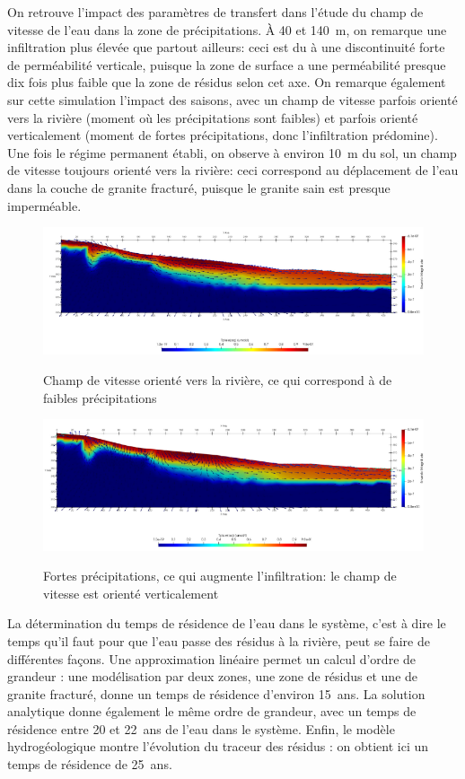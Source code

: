 \documentclass{article}
\begin{document}
On retrouve l'impact des paramètres de transfert dans l'étude du champ de vitesse de l'eau dans la zone de précipitations. À 40 et 140~m, on remarque une infiltration plus élevée que partout ailleurs: ceci est du à une discontinuité forte de perméabilité verticale, puisque la zone de surface a une perméabilité presque dix fois plus faible que la zone de résidus selon cet axe. On remarque également sur cette simulation l'impact des saisons, avec un champ de vitesse parfois orienté vers la rivière (moment où les précipitations sont faibles) et parfois orienté verticalement (moment de fortes précipitations, donc l'infiltration prédomine). Une fois le régime permanent établi, on observe à environ 10~m du sol, un champ de vitesse toujours orienté vers la rivière: ceci correspond au déplacement de l'eau dans la couche de granite fracturé, puisque le granite sain est presque imperméable.

\begin{figure}[H]
    \centering
    \includegraphics[width=0.9\linewidth]{III_B_3_6.png}
    \label{fig:v_précipitations_ribiere_1}
    \caption{Champ de vitesse orienté vers la rivière, ce qui correspond à de faibles précipitations}
\end{figure}

\begin{figure}[H]
    \centering
    \includegraphics[width=0.9\linewidth]{III_B_3_7.png}
    \label{fig:v_précipitations_ribiere_2}
    \caption{Fortes précipitations, ce qui augmente l'infiltration: le champ de vitesse est orienté verticalement}
\end{figure}



La détermination du temps de résidence de l'eau dans le système, c'est à dire le temps qu'il faut pour que l'eau passe des résidus à la rivière, peut se faire de différentes façons. Une approximation linéaire permet un calcul d’ordre de grandeur : une modélisation par deux zones, une zone de résidus et une de granite fracturé, donne un temps de résidence d’environ 15~ans. La solution analytique donne également le même ordre de grandeur, avec un temps de résidence entre 20 et 22~ans de l'eau dans le système. Enfin, le modèle hydrogéologique montre l’évolution du traceur des résidus : on obtient ici un temps de résidence de 25~ans.
\end{document}
